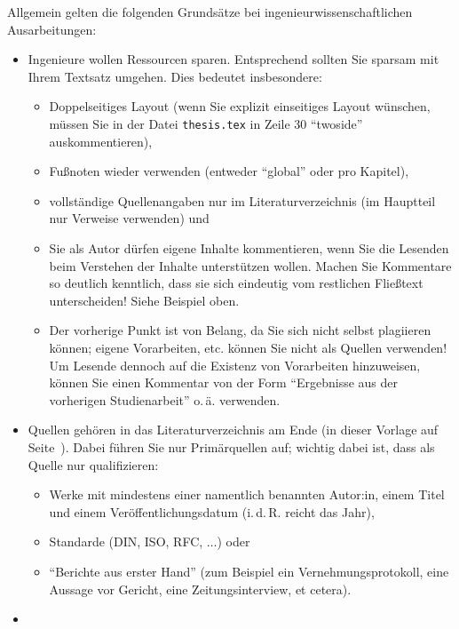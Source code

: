 \noindent Allgemein gelten die folgenden Grundsätze bei ingenieurwissenschaftlichen Ausarbeitungen:
\begin{itemize}
    \item{
        Ingenieure wollen Ressourcen sparen. Entsprechend sollten Sie sparsam mit Ihrem Textsatz umgehen. Dies bedeutet insbesondere:
        \begin{itemize}
            \item Doppelseitiges Layout (wenn Sie explizit einseitiges Layout wünschen, müssen Sie in der Datei \texttt{thesis.tex} in Zeile $30$ \enquote{twoside} auskommentieren),
            \item Fußnoten wieder verwenden (entweder \enquote{global} oder pro Kapitel),
            \item vollständige Quellenangaben nur im Literaturverzeichnis (im Hauptteil nur Verweise verwenden) und
            \item Sie als Autor dürfen eigene Inhalte kommentieren, wenn Sie die Lesenden beim Verstehen der Inhalte unterstützen wollen. Machen Sie Kommentare so deutlich kenntlich, dass sie sich eindeutig vom restlichen Fließtext unterscheiden! Siehe Beispiel oben.
            \item Der vorherige Punkt ist von Belang, da Sie sich nicht selbst plagiieren können; eigene Vorarbeiten, etc. können Sie nicht als Quellen verwenden! Um Lesende dennoch auf die Existenz von Vorarbeiten hinzuweisen, können Sie einen Kommentar von der Form \enquote{Ergebnisse aus der vorherigen Studienarbeit} o.\,ä. verwenden.
        \end{itemize}
    }
    \item{
        Quellen gehören in das Literaturverzeichnis am Ende (in dieser Vorlage auf Seite~\pageref{Bibliography}). Dabei führen Sie nur Primärquellen auf; wichtig dabei ist, dass als Quelle nur qualifizieren:
        \begin{itemize}
            \item Werke mit mindestens einer namentlich benannten Autor:in, einem Titel und einem Veröffentlichungsdatum (i.\,d.\,R. reicht das Jahr),
            \item Standarde (DIN, ISO, RFC, $\ldots$) oder
            \item \enquote{Berichte aus erster Hand} (zum Beispiel ein Vernehmungsprotokoll, eine Aussage vor Gericht, eine Zeitungsinterview, et cetera).
        \end{itemize}
    }
    \item{
}
\end{itemize}
